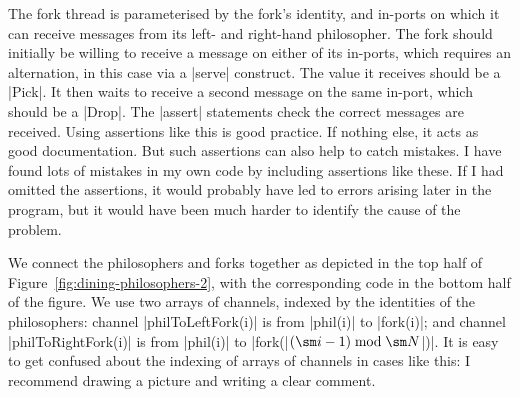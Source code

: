 The fork thread is parameterised by the fork's identity, and in-ports on which
it can receive messages from its left- and right-hand philosopher.  The fork
should initially be willing to receive a message on either of its in-ports,
which requires an alternation, in this case via a |serve| construct.  The
value it receives should be a |Pick|.  It then waits to receive a second
message on the same in-port, which should be a |Drop|.  The |assert|
statements check the correct messages are received.  Using assertions like
this is good practice.  If nothing else, it acts as good documentation.  But
such assertions can also help to catch mistakes.  I have found lots of
mistakes in my own code by including assertions like these.  If I had omitted
the assertions, it would probably have led to errors arising later in the
program, but it would have been much harder to identify the cause of the
problem.

We connect the philosophers and forks together as depicted in the top half of
Figure~\ref{fig:dining-philosophers-2}, with the corresponding code in the
bottom half of the figure.  We use two arrays of channels, indexed by the
identities of the philosophers: channel |philToLeftFork(i)| is from |phil(i)|
to |fork(i)|; and channel |philToRightFork(i)| is from |phil(i)| to
|fork(|$(\sm i-1) \bmod \sm N$|)|.  It is easy to get confused about the
indexing of arrays of channels in cases like this: I recommend drawing a
picture and writing a clear comment.  


